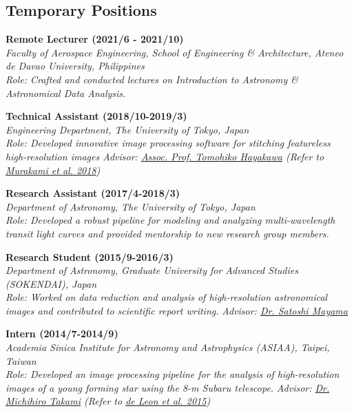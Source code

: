 \documentclass[11pt,letterpaper]{article}
\begin{document}
\subsection{Temporary Positions}
\begin{list}{}{\cvlist}
    \item
        \textbf{Remote Lecturer (2021/6 - 2021/10)} \\
        \textit{Faculty of Aerospace Engineering, School of Engineering \& Architecture, Ateneo de Davao University, Philippines} \\
        \textit{Role: Crafted and conducted lectures on Introduction to Astronomy \& Astronomical Data Analysis.}
        
    \item 
        \textbf{Technical Assistant (2018/10-2019/3)}\\
        \textit{Engineering Department, The University of Tokyo, Japan}\\
        \textit{Role: Developed innovative image processing software for stitching featureless high-resolution images 
        \textit{Advisor: \href{hayakawaurl}{Assoc. Prof. Tomohiko Hayakawa}} (Refer to \href{\spieurl}{Murakami et al. 2018})}

    \item 
        \textbf{Research Assistant (2017/4-2018/3)}\\	
        \textit{Department of Astronomy, The University of Tokyo, Japan}\\
        \textit{Role: Developed a robust pipeline for modeling and analyzing multi-wavelength transit light curves and provided mentorship to new research group members.}

    \item 
        \textbf{Research Student (2015/9-2016/3)}\\
        \textit{Department of Astronomy, Graduate University for Advanced Studies (SOKENDAI), Japan}\\
        \textit{Role: Worked on data reduction and analysis of high-resolution astronomical images and contributed to scientific report writing.}
        \textit{Advisor: \href{\mayamaurl}{Dr. Satoshi Mayama}} \\

    \item 
        \textbf{Intern (2014/7-2014/9)}\\
        \textit{Academia Sinica Institute for Astronomy and Astrophysics (ASIAA), Taipei, Taiwan}\\	
        \textit{Role: Developed an image processing pipeline for the analysis of high-resolution images of a young forming star using the 8-m Subaru telescope.}
        \textit{Advisor: \href{takamiurl}{Dr. Michihiro Takami} (Refer to \href{\paperone}{de Leon et al. 2015})} \\
\end{list}
\end{document}
